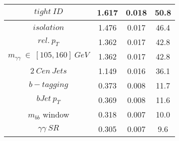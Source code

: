 \begin{table}
\begin{center}
\begin{tabular}{|c|c|c|c|}
 \hline
$tight\ ID$ & 1.617&0.018 &50.8 \\
 \hline
$isolation$ & 1.476&0.017 &46.4 \\
 \hline
$rel.\ p_{T}$ & 1.362&0.017 &42.8 \\
 \hline
$m_{\gamma\gamma}\ \in\ [105,160]\ GeV$ & 1.362&0.017 &42.8 \\
 \hline
$2\ Cen\ Jets$ & 1.149&0.016 &36.1 \\
 \hline
$b-tagging$ & 0.373&0.008 &11.7 \\
 \hline
$bJet\ p_{T}$ & 0.369&0.008 &11.6 \\
 \hline
$m_{bb}$ window & 0.318&0.007 &10.0 \\
 \hline
$\gamma\gamma\ SR$ & 0.305&0.007 & 9.6 \\
 \hline
\end{tabular}
\end{center}
\end{table}
